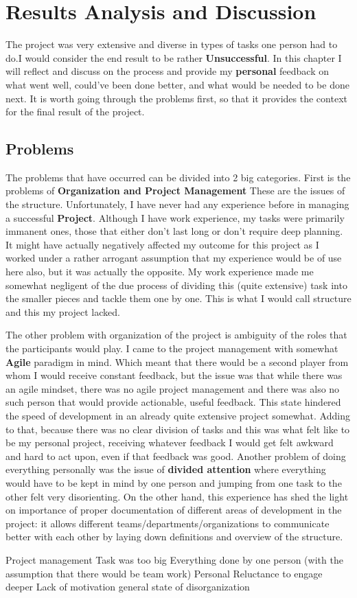 \section{Results Analysis and Discussion}
The project was very extensive and diverse in types of tasks one person had to do.I would consider the end result to be rather \textbf{Unsuccessful}. In this chapter I will reflect and discuss on the process and provide my \textbf{personal} feedback on what went well, could've been done better, and what would be needed to be done next. It is worth going through the problems first, so that it provides the context for the final result of the project.
\subsection{Problems}
The problems that have occurred can be divided into 2 big categories. First is the problems of \textbf{Organization and Project Management} These are the issues of the structure. Unfortunately, I have never had any experience before in managing a successful \textbf{Project}. Although I have work experience, my tasks were primarily immanent ones, those that either don't last long or don't require deep planning. It might have actually negatively affected my outcome for this project as I worked under a rather arrogant assumption that my experience would be of use here also, but it was actually the opposite. My work experience made me somewhat negligent of the due process of dividing this (quite extensive) task into the smaller pieces and tackle them one by one. This is what I would call structure and this my project lacked. 

The other problem with organization of the project is ambiguity of the roles that the participants would play. I came to the project management with somewhat \textbf{Agile} paradigm in mind. Which meant that there would be a second player from whom I would receive constant feedback, but the issue was that while there was an agile mindset, there was no agile project management and there was also no such person that would provide actionable, useful feedback. This state hindered the speed of development in an already quite extensive project somewhat. Adding to that, because there was no clear division of tasks and this was what felt like to be my personal project, receiving whatever feedback I would get felt awkward and hard to act upon, even if that feedback was good. Another problem of doing everything personally was the issue of \textbf{divided attention} where everything would have to be kept in mind by one person and jumping from one task to the other felt very disorienting. On the other hand, this experience has shed the light on importance of proper documentation of different areas of development in the project: it allows different teams/departments/organizations to communicate better with each other by laying down definitions and overview of the structure.

Project management
	Task was too big
	Everything done by one person (with the assumption that there would be team work)	
Personal
	Reluctance to engage deeper
	Lack of motivation
	general state of disorganization
